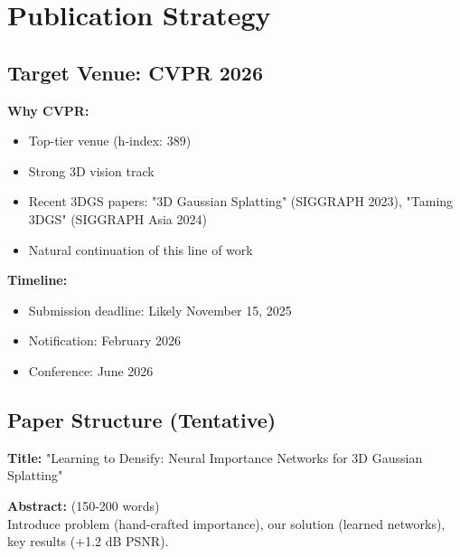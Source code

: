 \documentclass[11pt,letterpaper]{article}
\begin{document}
\section{Publication Strategy}

\subsection{Target Venue: CVPR 2026}

\textbf{Why CVPR:}
\begin{itemize}[leftmargin=*]
    \item Top-tier venue (h-index: 389)
    \item Strong 3D vision track
    \item Recent 3DGS papers: "3D Gaussian Splatting" (SIGGRAPH 2023), "Taming 3DGS" (SIGGRAPH Asia 2024)
    \item Natural continuation of this line of work
\end{itemize}

\textbf{Timeline:}
\begin{itemize}[leftmargin=*]
    \item Submission deadline: Likely November 15, 2025
    \item Notification: February 2026
    \item Conference: June 2026
\end{itemize}

\subsection{Paper Structure (Tentative)}

\textbf{Title:} "Learning to Densify: Neural Importance Networks for 3D Gaussian Splatting"

\textbf{Abstract:} (150-200 words) \\
Introduce problem (hand-crafted importance), our solution (learned networks), key results (+1.2 dB PSNR).
\end{document}
